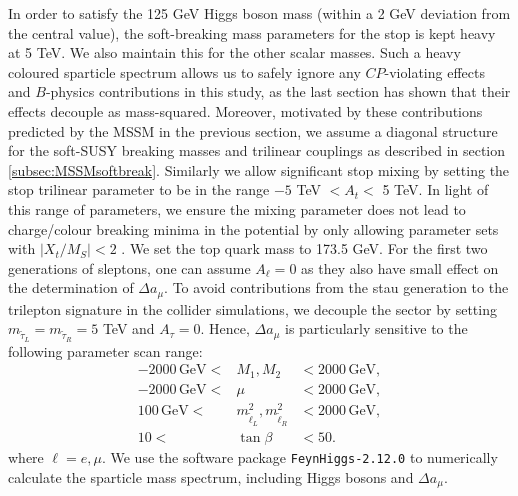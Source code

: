 In order to satisfy the 125 GeV Higgs boson mass (within a 2 GeV deviation from the central value), the soft-breaking mass parameters for the stop is kept heavy at 5 TeV. We also maintain this for the other scalar masses. Such a heavy coloured sparticle spectrum allows us to safely ignore any $CP$-violating effects and $B$-physics contributions in this study, as the last section has shown that their effects decouple as mass-squared. Moreover, motivated by these contributions predicted by the MSSM in the previous section, we assume a diagonal structure for the soft-SUSY breaking masses and trilinear couplings as described in section \ref{subsec:MSSMsoftbreak}. Similarly we allow significant stop mixing by setting the stop trilinear parameter to be in the range $-5$ TeV $< A_t <$ 5 TeV. In light of this range of parameters, we ensure the mixing parameter does not lead to charge/colour breaking minima in the potential by only allowing parameter sets with $|X_t / M_S | <2$ \cite{RN168}. We set the top quark mass to 173.5 GeV. For the first two generations of sleptons, one can assume $A_{\ell}=0$ as they also have small effect on the determination of $\Delta a_{\mu}$. To avoid contributions from the stau generation to the trilepton signature in the collider simulations, we decouple the sector by setting $m_{{\tilde{\tau}}_L}=m_{{\tilde{\tau}}_R}=5$ TeV and $A_{\tau}=0$. Hence, $\Delta a_{\mu}$ is particularly sensitive to the following parameter scan range:
\begin{eqnarray}
-2000\,\text{GeV} <& M_1,M_2 &< 2000\,\text{GeV}, \nonumber \\
-2000\,\text{GeV} <& \mu &< 2000\,\text{GeV}, \nonumber \\
100\,\text{GeV} <& m^2_{\tilde{\ell}_{L}},m^2_{\tilde{\ell}_{R}} &< 2000\,\text{GeV}, \nonumber \\
10 <& \tan \beta &< 50. \label{eqn:amuparam}
\end{eqnarray}
where $\ell=e,\mu$. We use the software package \texttt{FeynHiggs-2.12.0} \cite{RN166} to numerically calculate the sparticle mass spectrum, including Higgs bosons and $\Delta a_{\mu}$.

